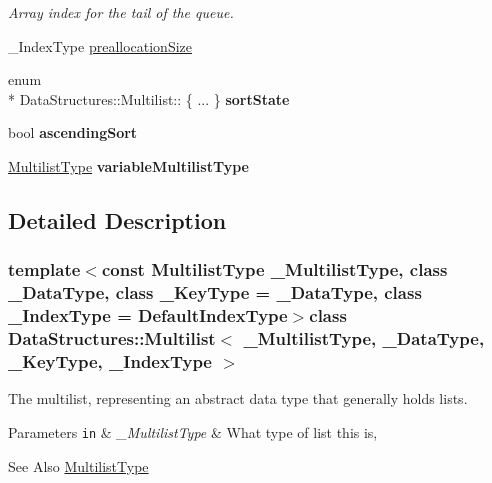 \begin{DoxyCompactItemize}
\begin{DoxyCompactList}\small\item\em Array index for the tail of the queue. \end{DoxyCompactList}\item 
\-\_\-\-Index\-Type \hyperlink{class_data_structures_1_1_multilist_aaa5f425e786988300c1cc1c782173b4c}{preallocation\-Size}
\item 
\hypertarget{class_data_structures_1_1_multilist_ad28ab4936d56170b875d73ede3b08443}{enum \\*
Data\-Structures\-::\-Multilist\-:: \{ ... \}  {\bfseries sort\-State}}\label{class_data_structures_1_1_multilist_ad28ab4936d56170b875d73ede3b08443}

\item 
\hypertarget{class_data_structures_1_1_multilist_adff4e984b62dd496b3c91cf7ca526f9e}{bool {\bfseries ascending\-Sort}}\label{class_data_structures_1_1_multilist_adff4e984b62dd496b3c91cf7ca526f9e}

\item 
\hypertarget{class_data_structures_1_1_multilist_ab8407a503dfe3a7ddb87351504e99f91}{\hyperlink{_d_s___multilist_8h_a8387ff66ed3a8c8a6c0528ddb5650a5b}{Multilist\-Type} {\bfseries variable\-Multilist\-Type}}\label{class_data_structures_1_1_multilist_ab8407a503dfe3a7ddb87351504e99f91}

\end{DoxyCompactItemize}


\subsection{Detailed Description}
\subsubsection*{template$<$const Multilist\-Type \-\_\-\-Multilist\-Type, class \-\_\-\-Data\-Type, class \-\_\-\-Key\-Type = \-\_\-\-Data\-Type, class \-\_\-\-Index\-Type = Default\-Index\-Type$>$class Data\-Structures\-::\-Multilist$<$ \-\_\-\-Multilist\-Type, \-\_\-\-Data\-Type, \-\_\-\-Key\-Type, \-\_\-\-Index\-Type $>$}

The multilist, representing an abstract data type that generally holds lists. 


\begin{DoxyParams}[1]{Parameters}
\mbox{\tt in}  & {\em \-\_\-\-Multilist\-Type} & What type of list this is, \\
\hline
\end{DoxyParams}
\begin{DoxySeeAlso}{See Also}
\hyperlink{_d_s___multilist_8h_a8387ff66ed3a8c8a6c0528ddb5650a5b}{Multilist\-Type} 
\end{DoxySeeAlso}

